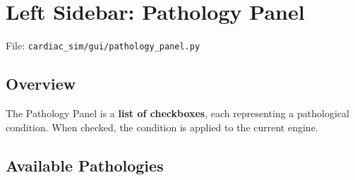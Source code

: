 \documentclass[12pt,a4paper,oneside]{book}
\begin{document}
\section{Left Sidebar: Pathology Panel}

File: \texttt{cardiac\_sim/gui/pathology\_panel.py}

\subsection{Overview}

The Pathology Panel is a \textbf{list of checkboxes}, each representing a pathological condition. When checked, the condition is applied to the current engine.

\subsection{Available Pathologies}
\end{document}
